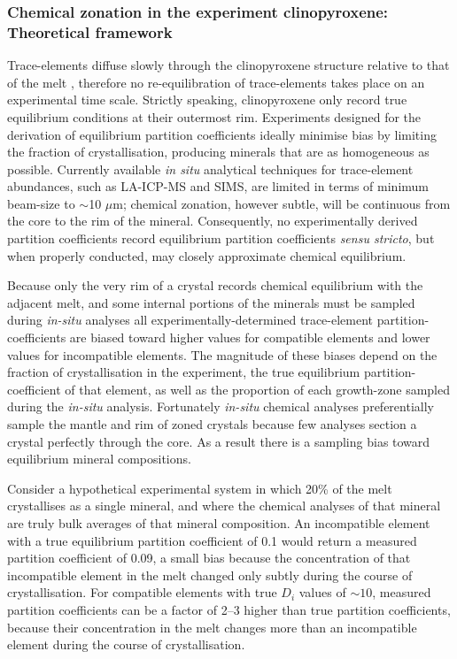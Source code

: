 \documentclass[review,authoryear,12pt]{elsarticle}
\begin{document}
\subsubsection{Chemical zonation in the experiment clinopyroxene: Theoretical framework}
Trace-elements diffuse slowly through the clinopyroxene structure relative to that of the melt \citep{VanOrman2001, Zhang2010}, therefore no re-equilibration of trace-elements takes place on an experimental time scale. Strictly speaking, clinopyroxene only record true equilibrium conditions at their outermost rim. 
     Experiments designed for the derivation of equilibrium partition coefficients ideally minimise bias by limiting the fraction of crystallisation, producing minerals that are as homogeneous as possible. Currently available \textit{in situ} analytical techniques for trace-element abundances, such as LA-ICP-MS and SIMS, are limited in terms of minimum beam-size to $\sim$10 $\mu$m; chemical zonation, however subtle, will be continuous from the core to the rim of the mineral. Consequently, no experimentally derived partition coefficients record equilibrium partition coefficients \textit{sensu stricto}, but when properly conducted, may closely approximate chemical equilibrium.

Because only the very rim of a crystal records chemical equilibrium with the adjacent melt, and some internal portions of the minerals must be sampled during \textit{in-situ} analyses all experimentally-determined trace-element partition-coefficients are biased toward higher values for compatible elements and lower values for incompatible elements. The magnitude of these biases depend on the fraction of crystallisation in the experiment, the true equilibrium partition-coefficient of that element, as well as the proportion of each growth-zone sampled during the \textit{in-situ} analysis. Fortunately \textit{in-situ} chemical analyses preferentially sample the mantle and rim of zoned crystals because few analyses section a crystal perfectly through the core. As a result there is a sampling bias toward equilibrium mineral compositions.


	Consider a hypothetical experimental system in which 20\% of the melt crystallises as a single mineral, and where the chemical analyses of that mineral are truly bulk averages of that mineral composition. An incompatible element with a true equilibrium partition coefficient of 0.1 would return a measured partition coefficient of 0.09, a small bias because the concentration of that incompatible element in the melt changed only subtly during the course of crystallisation. For compatible elements with true $D_i$ values of $\sim 10$, measured partition coefficients can be a factor of 2--3 higher than true partition coefficients, because their concentration in the melt changes more than an incompatible element during the course of crystallisation.
\end{document}
